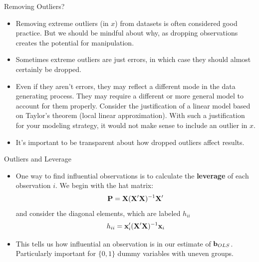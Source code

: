 \documentclass[aspectratio=169,11pt]{beamer}
\begin{document}
\begin{frame}{Removing Outliers?}
\begin{itemize}
\item Removing extreme outliers (in $x$) from datasets is often considered good practice. But we should be mindful
		about why, as dropping observations creates the potential for manipulation. 

	\medskip
	\item Sometimes extreme outliers are just errors, in which case they should almost certainly be dropped.

	\medskip
	\item Even if they aren't errors, they may reflect a different mode in the data generating process. They may require
		a different or more general model to account for them properly. Consider the justification of a linear
		model based on Taylor's theorem (local linear approximation). With such a justification for your modeling
		strategy, it would not make sense to include an outlier in $x$.
	\medskip
	\item It's important to be transparent about how dropped outliers affect results. 

\end{itemize}
\end{frame}




\begin{frame}{Outliers and Leverage}
\begin{itemize}
\item One way to find influential observations is to calculate the {\bf leverage} of each observation $i$. We begin with the hat matrix:
\begin{align*}
{\bf P} = {\bf X} ({\bf X} '{\bf X})^{-1}  {\bf X}'
\end{align*}
and consider the diagonal elements, which are labeled $h_{ii}$
\begin{align*}
h_{ii} = {\bf x}_i' ({\bf X} '{\bf X})^{-1}  {\bf x}_i
\end{align*}

\medskip
\item This tells us how influential an observation is in our estimate of ${\bf b}_{OLS}$.\\
Particularly important for $\{0,1\}$ dummy variables with uneven groups.
\end{itemize}
\end{frame}
\end{document}
